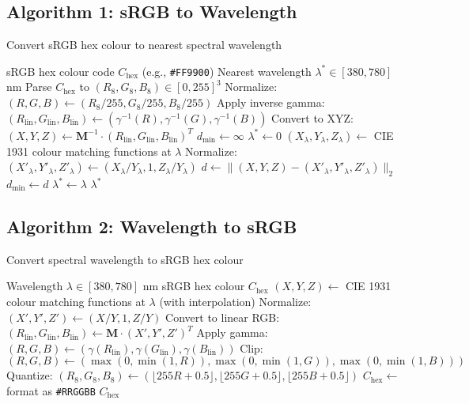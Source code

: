 \documentclass[12pt,a4paper]{article}
\newcommand{\wavelength}{\lambda}
\begin{document}
\subsection{Algorithm 1: sRGB to Wavelength}

\begin{algorithm}[ht]
\caption{Convert sRGB hex colour to nearest spectral wavelength}
\label{alg:rgb2wave}
\begin{algorithmic}[1]
\REQUIRE sRGB hex colour code $C_{\text{hex}}$ (e.g., \texttt{\#FF9900})
\ENSURE Nearest wavelength $\wavelength^* \in [380, 780]$ nm
\STATE Parse $C_{\text{hex}}$ to $(R_{8}, G_{8}, B_{8}) \in [0, 255]^3$
\STATE Normalize: $(R, G, B) \leftarrow (R_{8}/255, G_{8}/255, B_{8}/255)$
\STATE Apply inverse gamma: $(R_{\text{lin}}, G_{\text{lin}}, B_{\text{lin}}) \leftarrow (\gamma^{-1}(R), \gamma^{-1}(G), \gamma^{-1}(B))$
\STATE Convert to XYZ: $(X, Y, Z) \leftarrow \mathbf{M}^{-1} \cdot (R_{\text{lin}}, G_{\text{lin}}, B_{\text{lin}})^T$
\STATE $d_{\min} \leftarrow \infty$
\STATE $\wavelength^* \leftarrow 0$
\FOR{$\wavelength = 380$ \TO $780$ \textbf{step} $5$}
    \STATE $(X_{\wavelength}, Y_{\wavelength}, Z_{\wavelength}) \leftarrow$ CIE 1931 colour matching functions at $\wavelength$
    \STATE Normalize: $(X'_{\wavelength}, Y'_{\wavelength}, Z'_{\wavelength}) \leftarrow (X_{\wavelength}/Y_{\wavelength}, 1, Z_{\wavelength}/Y_{\wavelength})$
    \STATE $d \leftarrow \|(X, Y, Z) - (X'_{\wavelength}, Y'_{\wavelength}, Z'_{\wavelength})\|_2$
        \STATE $d_{\min} \leftarrow d$
        \STATE $\wavelength^* \leftarrow \wavelength$
    \ENDIF
\ENDFOR
\RETURN $\wavelength^*$
\end{algorithmic}
\end{algorithm}

\subsection{Algorithm 2: Wavelength to sRGB}

\begin{algorithm}[ht]
\caption{Convert spectral wavelength to sRGB hex colour}
\label{alg:wave2rgb}
\begin{algorithmic}[1]
\REQUIRE Wavelength $\wavelength \in [380, 780]$ nm
\ENSURE sRGB hex colour $C_{\text{hex}}$
\STATE $(X, Y, Z) \leftarrow$ CIE 1931 colour matching functions at $\wavelength$ (with interpolation)
\STATE Normalize: $(X', Y', Z') \leftarrow (X/Y, 1, Z/Y)$
\STATE Convert to linear RGB: $(R_{\text{lin}}, G_{\text{lin}}, B_{\text{lin}}) \leftarrow \mathbf{M} \cdot (X', Y', Z')^T$
\STATE Apply gamma: $(R, G, B) \leftarrow (\gamma(R_{\text{lin}}), \gamma(G_{\text{lin}}), \gamma(B_{\text{lin}}))$
\STATE Clip: $(R, G, B) \leftarrow (\max(0, \min(1, R)), \max(0, \min(1, G)), \max(0, \min(1, B)))$
\STATE Quantize: $(R_{8}, G_{8}, B_{8}) \leftarrow (\lfloor 255R + 0.5 \rfloor, \lfloor 255G + 0.5 \rfloor, \lfloor 255B + 0.5 \rfloor)$
\STATE $C_{\text{hex}} \leftarrow$ format as \texttt{\#RRGGBB}
\RETURN $C_{\text{hex}}$
\end{algorithmic}
\end{algorithm}
\end{document}
